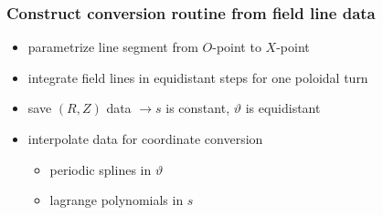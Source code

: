 \documentclass{beamer}
\begin{document}
\begin{frame}
\frametitle{Construct conversion routine from \newline field line data}
\vspace{0 cm}
		\vspace{-0.5 cm}
		\begin{center}
			\begin{itemize}
				\item parametrize line segment from $O$-point to $X$-point
				\item integrate field lines in equidistant steps for one poloidal turn				
				\item save $(R,Z)$ data $\rightarrow s$ is constant, $\vartheta$ is equidistant
				\item interpolate data for coordinate conversion
							\begin{itemize}
				\item periodic splines in $\vartheta$
				\item lagrange polynomials in $s$
			\end{itemize}
			\end{itemize}
		\end{center}
\end{frame}
\end{document}
